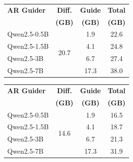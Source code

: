 \begin{minipage}{.48\linewidth}
\centering
\begin{tabular}{lccc}
\toprule
\textbf{AR Guider} & \textbf{Diff.} & \textbf{Guide} & \textbf{Total} \\
                   & \textbf{(GB)}  & \textbf{(GB)}  & \textbf{(GB)} \\
\midrule
Qwen2.5-0.5B  &  \multirow{4}{*}{20.7} & 1.9  & 22.6 \\
Qwen2.5-1.5B  &                        & 4.1  & 24.8 \\
Qwen2.5-3B    &                        & 6.7  & 27.4 \\
Qwen2.5-7B    &                        & 17.3 & 38.0 \\
\bottomrule
\end{tabular}
\label{tab:memory-llada}
\end{minipage}
\hfill
\begin{minipage}{.48\linewidth}
\centering
\begin{tabular}{lccc}
\toprule
\textbf{AR Guider} & \textbf{Diff.} & \textbf{Guide} & \textbf{Total} \\
                   & \textbf{(GB)}  & \textbf{(GB)}  & \textbf{(GB)} \\
\midrule
Qwen2.5-0.5B  &   \multirow{4}{*}{14.6} & 1.9  & 16.5 \\
Qwen2.5-1.5B  &                        & 4.1  & 18.7 \\
Qwen2.5-3B    &                        & 6.7  & 21.3 \\
Qwen2.5-7B    &                        & 17.3 & 31.9 \\
\bottomrule
\end{tabular}
\label{tab:memory-dream}
\end{minipage}







